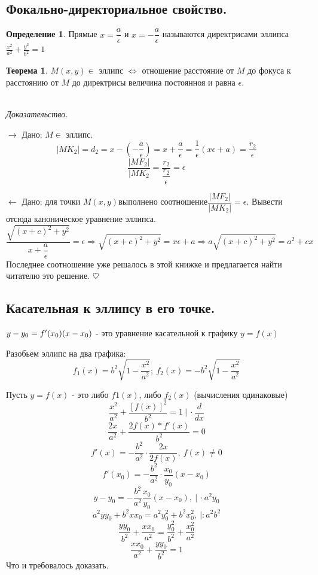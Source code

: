 \documentclass{article}
\theoremstyle{definition}
\newtheorem{definition}{Определение}
\newtheorem{theorem}{Теорема}[section]
\newenvironment{ourproof}{\textit{\\ Доказательство.\\ }}{$\hfill \heartsuit$}
\begin{document}
\subsection{Фокально-директориальное свойство.}

\begin{definition}
 
Прямые $x = \dfrac{a}{\epsilon}$ и $x = - \dfrac{a}{\epsilon}$ называются директрисами эллипса $\frac{x^2}{a^2} + \frac{y^2}{b^2} = 1$
\end{definition}

\begin{theorem}
 $M(x, y) \in $ эллипс $\Leftrightarrow$ отношение расстояние от $M$ до фокуса к расстоянию от $M$ до директрисы величина постоянноя и равна $\epsilon$.

\begin{ourproof}{}

$\rightarrow$ Дано: $M \in $ эллипс. 
$$|M K_2| = d_2 = x - \left(- \frac{a}{\epsilon}\right) = x + \frac{a}{\epsilon} = \frac{1}{\epsilon}\left(x \epsilon + a\right) = \frac{r_2}{\epsilon}$$
$$\frac{|M F_2|}{|M K_2} = \dfrac{r_2}{\dfrac{r_2}{\epsilon}} = \epsilon $$

$\leftarrow$ Дано: для точки $M(x, y) \textrm{выполнено соотношение} \dfrac{|M F_2|}{|M K_2|} = \epsilon$. Вывести отсюда каноническое уравнение эллипса. 
$$\frac{\sqrt{(x + c)^2 + y^2}}{x + \dfrac{a}{\epsilon}} = \epsilon \Rightarrow \sqrt{(x + c)^2 + y^2} = x \epsilon+ a \Rightarrow a \sqrt{(x + c)^2 + y^2} = a^2 + c x$$
Последнее соотношение уже решалось в этой книжке и предлагается найти читателю это решение.
\end{ourproof} 
\end{theorem}

\subsection{Касательная к эллипсу в его точке.}
$\\ y - y_0 = f'(x_0)(x - x_0)$ - это уравнение касательной к графику $y = f(x)$

Разобьем эллипс на два графика: 
$$f_1(x) = b^2 \sqrt{1 - \frac{x^2}{a^2}}; \ f_2(x) = -b^2 \sqrt{1 - \frac{x^2}{a^2}}$$

Пусть $y= f(x)$ - это либо $f1(x)$, либо $f_2 (x)$ (вычисления одинаковые)
$$\frac{x^2}{a^2} + \frac{[f(x)]^2}{b^2} = 1 \ | \ \cdot\frac{d}{d x} $$
$$\frac{2x}{a^2} + \frac{2 f(x) * f' (x)}{b ^ 2} = 0$$
$$f' (x) = - \frac{b^2}{a^2} \cdot \frac{2x}{2 f(x)}, \ f(x) \neq 0 $$
$$f' (x_0) = - \frac{b^2}{a^2} \cdot \frac{x_0}{y_0} (x - x_0)$$
$$y - y_0 = -\frac{b^2}{a^2} \frac{x_0}{y_0} (x - x_0), \ | \ \cdot a^2 y_0 $$
$$a^2 y y_0 + b^2 x x_0 = a^2 y_0^2 + b^2 x_0^2, \ | : a^2 b^2 $$
$$\frac{y y_0}{b^2} + \frac{x x_0}{a^2} = \frac{y_0^2}{b^2} + \frac{x_0^2}{a^2} $$
$$\frac{x x_0}{a^2} + \frac{y y_0}{b^2} = 1 $$
Что и требовалось доказать.
\end{document}
